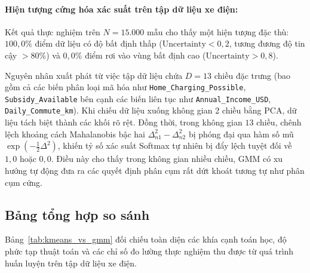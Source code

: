 \paragraph{Hiện tượng cứng hóa xác suất trên tập dữ liệu xe điện:}
Kết quả thực nghiệm trên $N = 15.000$ mẫu cho thấy một hiện tượng đặc thù: $100{,}0\%$ điểm dữ liệu có độ bất định thấp ($\text{Uncertainty} < 0{,}2$, tương đương độ tin cậy $> 80\%$) và $0{,}0\%$ điểm rơi vào vùng bất định cao ($\text{Uncertainty} > 0{,}8$). 

Nguyên nhân xuất phát từ việc tập dữ liệu chứa $D = 13$ chiều đặc trưng (bao gồm cả các biến phân loại mã hóa như \texttt{Home\_Charging\_Possible}, \texttt{Subsidy\_Available} bên cạnh các biến liên tục như \texttt{Annual\_Income\_USD}, \texttt{Daily\_Commute\_km}). Khi chiếu dữ liệu xuống không gian 2 chiều bằng PCA, dữ liệu tách biệt thành các khối rõ rệt. Đồng thời, trong không gian $13$ chiều, chênh lệch khoảng cách Mahalanobis bậc hai $\Delta_{n1}^2 - \Delta_{n2}^2$ bị phóng đại qua hàm số mũ $\exp(-\frac{1}{2}\Delta^2)$, khiến tỷ số xác suất Softmax tự nhiên bị đẩy lệch tuyệt đối về $1{,}0$ hoặc $0{,}0$. Điều này cho thấy trong không gian nhiều chiều, GMM có xu hướng tự động đưa ra các quyết định phân cụm rất dứt khoát tương tự như phân cụm cứng.

\subsection{Bảng tổng hợp so sánh}

Bảng~\ref{tab:kmeans_vs_gmm} đối chiếu toàn diện các khía cạnh toán học, độ phức tạp thuật toán và các chỉ số đo lường thực nghiệm thu được từ quá trình huấn luyện trên tập dữ liệu xe điện.


